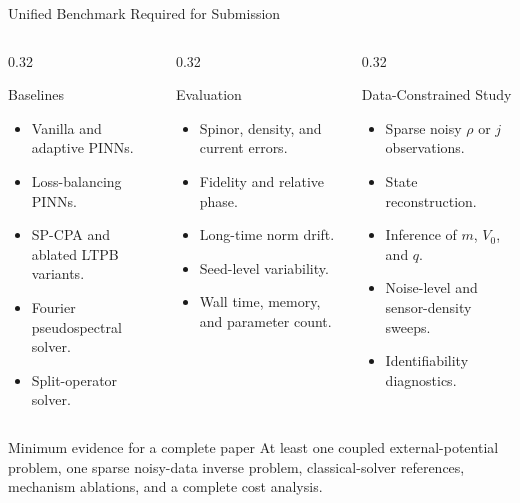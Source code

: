 \documentclass[aspectratio=169,10pt]{beamer}
\begin{document}
\begin{frame}{Unified Benchmark Required for Submission}
\begin{columns}[T,onlytextwidth]
\begin{column}{0.32\textwidth}
\begin{block}{Baselines}
\begin{itemize}
  \item Vanilla and adaptive PINNs.
  \item Loss-balancing PINNs.
  \item SP-CPA and ablated LTPB variants.
  \item Fourier pseudospectral solver.
  \item Split-operator solver.
\end{itemize}
\end{block}
\end{column}
\begin{column}{0.32\textwidth}
\begin{block}{Evaluation}
\begin{itemize}
  \item Spinor, density, and current errors.
  \item Fidelity and relative phase.
  \item Long-time norm drift.
  \item Seed-level variability.
  \item Wall time, memory, and parameter count.
\end{itemize}
\end{block}
\end{column}
\begin{column}{0.32\textwidth}
\begin{block}{Data-Constrained Study}
\begin{itemize}
  \item Sparse noisy \(\rho\) or \(j\) observations.
  \item State reconstruction.
  \item Inference of \(m\), \(V_0\), and \(q\).
  \item Noise-level and sensor-density sweeps.
  \item Identifiability diagnostics.
\end{itemize}
\end{block}
\end{column}
\end{columns}

\begin{alertblock}{Minimum evidence for a complete paper}
At least one coupled external-potential problem, one sparse noisy-data inverse
problem, classical-solver references, mechanism ablations, and a complete cost
analysis.
\end{alertblock}
\end{frame}
\end{document}
